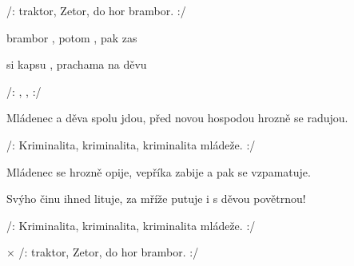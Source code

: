 

\zr
/:  traktor,  Zetor,
 do hor  brambor. :/
\kr

\zs
{} brambor , potom , pak zas 

 si kapsu , prachama  na děvu 

/: , ,   :/
\ks

\zs
Mládenec a děva spolu jdou, před novou hospodou hrozně se radujou.


/: Kriminalita, kriminalita, kriminalita mládeže. :/
\ks

\zs
Mládenec se hrozně opije, vepříka zabije a pak se vzpamatuje.

Svýho činu ihned lituje, za mříže putuje i s děvou povětrnou!

/: Kriminalita, kriminalita, kriminalita mládeže. :/
\ks

× /:  traktor,  Zetor,  do hor  brambor. :/
\kr

\kp
